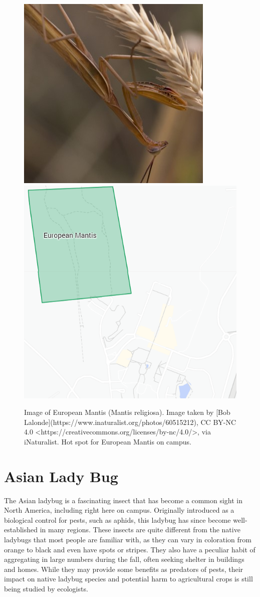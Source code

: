 \documentclass[
]{book}
\begin{document}
\begin{figure}

{\centering \includegraphics[width=0.49\linewidth,height=0.2\textheight]{insect_images/mantis_11} \includegraphics[width=0.49\linewidth,height=0.2\textheight]{insect_images/mantis_hotspot_11} 

}

\caption{Image of European Mantis (Mantis religiosa). Image taken by [Bob Lalonde](https://www.inaturalist.org/photos/60515212), CC BY-NC 4.0 <https://creativecommons.org/licenses/by-nc/4.0/>, via iNaturalist. Hot spot for European Mantis on campus.}\label{fig:unnamed-chunk-2}
\end{figure}

\hypertarget{asian-lady-bug}{%
\section{Asian Lady Bug}\label{asian-lady-bug}}

The Asian ladybug is a fascinating insect that has become a common sight in North America, including right here on campus. Originally introduced as a biological control for pests, such as aphids, this ladybug has since become well-established in many regions. These insects are quite different from the native ladybugs that most people are familiar with, as they can vary in coloration from orange to black and even have spots or stripes. They also have a peculiar habit of aggregating in large numbers during the fall, often seeking shelter in buildings and homes. While they may provide some benefits as predators of pests, their impact on native ladybug species and potential harm to agricultural crops is still being studied by ecologists.
\end{document}
